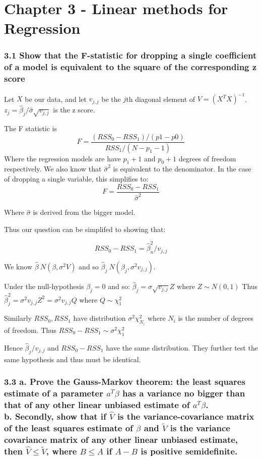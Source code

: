 

\chapter{Chapter 3 - Linear methods for Regression}

\subsection*{3.1 Show that the F-statistic for dropping a single coefficient of a model is equivalent to the square of the corresponding z score}

Let $X$ be our data, and let $v_{j,j}$ be the $j$th diagonal element of $V = (X^T X)^{-1}$. $z_j = \hat{\beta}_j / \hat{\sigma} \sqrt{v_{j,j}}$ is the z score. 

The F statistic is $$ F = \frac{(RSS_0 - RSS_1) / (p1 - p0)}{RSS_1 / (N - p_1 - 1)}$$
Where the regression models are have $p_1 + 1$ and $p_0 + 1$ degrees of freedom respectively.
We also know that $\hat{\sigma}^2$ is equivalent to the denominator. In the case of dropping a single variable, this simplifies to:
$$ F = \frac{RSS_0 - RSS_1}{\hat{\sigma}^2}$$

Where $\hat{\sigma}$ is derived from the bigger model.

Thus our question can be simplifed to showing that: 

$$ RSS_0 - RSS_1 = \hat{\beta}_n^2 /  v_{j,j} $$

We know $\hat{\beta} ~ N(\beta, \sigma^2 V)$ and so $\hat{\beta}_j ~ N(\beta_j, \sigma^2 v_{j,j})$.

Under the null-hypothesis $\beta_j = 0$ and so: $\hat{\beta}_j = \sigma \sqrt{v_{j,j}} Z$ where $Z \sim N(0,1)$
Thus $\hat{\beta}^2_j = \sigma^2 v_{j,j} Z^2 = \sigma^2 v_{j,j} Q$ where $Q \sim \chi^2_1$

Similarly $RSS_0, RSS_1$ have distribution $\sigma^2 \chi^2_{N_i}$ where $N_i$ is the number of degrees of freedom. Thus $RSS_0 - RSS_1  \sim \sigma^2 \chi^2_1$

Hence $\hat{\beta}_j / v_{j,j}$ and $RSS_0 - RSS_1$ have the same distribution. They further test the same hypothesis and thus must be identical.








\subsection*{3.3 
a. Prove the Gauss-Markov theorem: the least squares estimate of a parameter $a^T\beta$ has a variance no bigger than that of any other linear unbiased estimate of $a^T\beta$.\\
b. Secondly, show that if $\hat{V}$ is the variance-covariance matrix of the least squares estimate of $\beta$ and $\tilde{V}$ is the variance covariance matrix of any other linear unbiased estimate, then $\hat{V} \leq \tilde{V}$, where $B \leq A$ if $A - B$ is positive semidefinite.}


